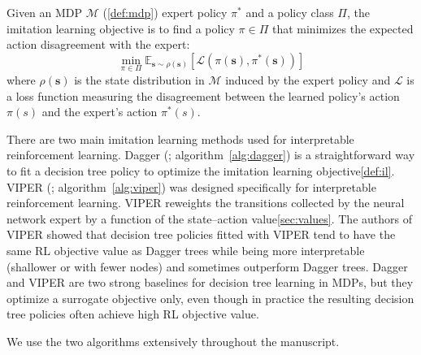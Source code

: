 \begin{definition}\label{def:il}
Given an MDP $\mathcal{M}$ (\ref{def:mdp}) expert policy $\pi^*$ and a policy class $\Pi$, the imitation learning objective is to find a policy $\pi \in \Pi$ that minimizes the expected action disagreement with the expert:
\begin{equation}
\min_{\pi \in \Pi} \mathbb{E}_{\boldsymbol{s} \sim \rho(\boldsymbol{s})} \left[ \mathcal{L}(\pi(\boldsymbol{s}), \pi^*(\boldsymbol{s})) \right]
\end{equation}
where $\rho(\boldsymbol{s})$ is the state distribution in $\mathcal{M}$ induced by the expert policy and $\mathcal{L}$ is a loss function measuring the disagreement between the learned policy's action $\pi(s)$ and the expert's action $\pi^*(s)$.
\end{definition}

There are two main imitation learning methods used for interpretable reinforcement learning.
Dagger (\cite{PIRL}; algorithm~\ref{alg:dagger}) is a straightforward way to fit a decision tree policy to optimize the imitation learning objective\ref{def:il}.
VIPER (\cite{viper}; algorithm~\ref{alg:viper}) was designed specifically for interpretable reinforcement learning.
VIPER reweights the transitions collected by the neural network expert by a function of the state–action value\ref{sec:values}.
The authors of VIPER showed that decision tree policies fitted with VIPER tend to have the same RL objective value as Dagger trees while being more interpretable (shallower or with fewer nodes) and sometimes outperform Dagger trees.
Dagger and VIPER are two strong baselines for decision tree learning in MDPs, but they optimize a surrogate objective only, even though in practice the resulting decision tree policies often achieve high RL objective value.

We use the two algorithms extensively throughout the manuscript.

